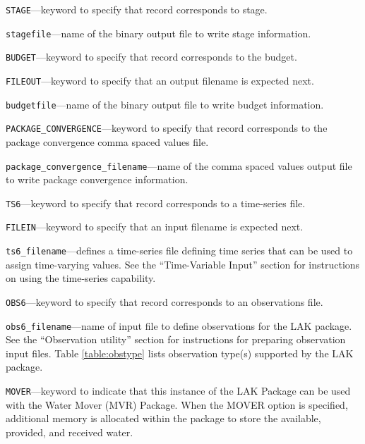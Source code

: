 \begin{description}
\item \texttt{STAGE}---keyword to specify that record corresponds to stage.

\item \texttt{stagefile}---name of the binary output file to write stage information.

\item \texttt{BUDGET}---keyword to specify that record corresponds to the budget.

\item \texttt{FILEOUT}---keyword to specify that an output filename is expected next.

\item \texttt{budgetfile}---name of the binary output file to write budget information.

\item \texttt{PACKAGE\_CONVERGENCE}---keyword to specify that record corresponds to the package convergence comma spaced values file.

\item \texttt{package\_convergence\_filename}---name of the comma spaced values output file to write package convergence information.

\item \texttt{TS6}---keyword to specify that record corresponds to a time-series file.

\item \texttt{FILEIN}---keyword to specify that an input filename is expected next.

\item \texttt{ts6\_filename}---defines a time-series file defining time series that can be used to assign time-varying values. See the ``Time-Variable Input'' section for instructions on using the time-series capability.

\item \texttt{OBS6}---keyword to specify that record corresponds to an observations file.

\item \texttt{obs6\_filename}---name of input file to define observations for the LAK package. See the ``Observation utility'' section for instructions for preparing observation input files. Table \ref{table:obstype} lists observation type(s) supported by the LAK package.

\item \texttt{MOVER}---keyword to indicate that this instance of the LAK Package can be used with the Water Mover (MVR) Package.  When the MOVER option is specified, additional memory is allocated within the package to store the available, provided, and received water.


\end{description}
